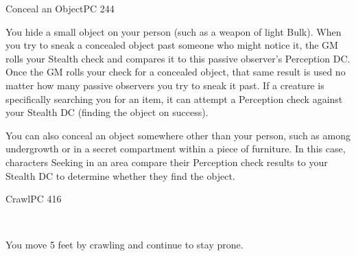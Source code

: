 \documentclass[12pt,openany,twocolumn]{book}
\begin{document}
\begin{action}{Conceal an Object}{}{PC 244}
    \begin{actioninfo}
    \end{actioninfo}

    \begin{actionbody}
        You hide a small object on your person (such as a weapon of light Bulk). When you try to sneak a concealed object past someone who might notice it, the GM rolls your Stealth check and compares it to this passive observer's Perception DC. Once the GM rolls your check for a concealed object, that same result is used no matter how many passive observers you try to sneak it past. If a creature is specifically searching you for an item, it can attempt a Perception check against your Stealth DC (finding the object on success).

        You can also conceal an object somewhere other than your person, such as among undergrowth or in a secret compartment within a piece of furniture. In this case, characters Seeking in an area compare their Perception check results to your Stealth DC to determine whether they find the object.
    \end{actionbody}


\end{action}

\begin{action}{Crawl}{}{PC 416}
    \begin{actioninfo}
         \\
    \end{actioninfo}

    \begin{actionbody}
        You move 5 feet by crawling and continue to stay prone.
    \end{actionbody}
\end{action}
\end{document}
